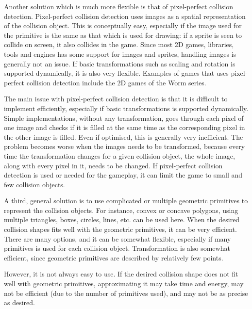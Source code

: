 Another solution which is much more flexible is that of pixel-perfect collision detection.
Pixel-perfect collision detection uses images as a spatial representation of the
collision object. This is conceptually easy, especially if the image used for
the primitive is the same as that which is used for drawing: if a sprite is
seen to collide on screen, it also collides in the game.
Since most 2D games, libraries, tools and engines has some
support for images and sprites, handling images is generally not an issue.
If basic transformations such as scaling and rotation is supported dynamically,
it is also very flexible. Examples of games that uses pixel-perfect collision
detection include the 2D games of the Worm series.

The main issue with pixel-perfect collision detection is that it is difficult to
implement efficiently, especially if basic transformations is supported dynamically.
Simple implementations, without any transformation, goes through each pixel of one
image and checks if it is filled at the same time as the corresponding pixel
in the other image is filled. Even if optimised, this is generally very inefficient.
The problem becomes worse when the images needs to be transformed,
because every time the transformation changes for a given collision object,
the whole image, along with every pixel in it, needs to be changed.
If pixel-perfect collision detection is used or needed for the gameplay,
it can limit the game to small and few collision objects.

A third, general solution is to use complicated or multiple geometric primitives
to represent the collision objects. For instance, convex or concave polygons,
using multiple triangles, boxes, circles, lines, etc. can be used here.
When the desired collision shapes fits well with the geometric primitives,
it can be very efficient.
There are many options, and it can be somewhat flexible, especially if many
primitives is used for each collision object. Transformation is also somewhat
efficient, since geometric primitives are described by relatively few points.

However, it is not always easy to use. If the desired collision shape does not
fit well with geometric primitives, approximating it may take time
and energy, may not be efficient (due to the number of primitives used),
and may not be as precise as desired.

